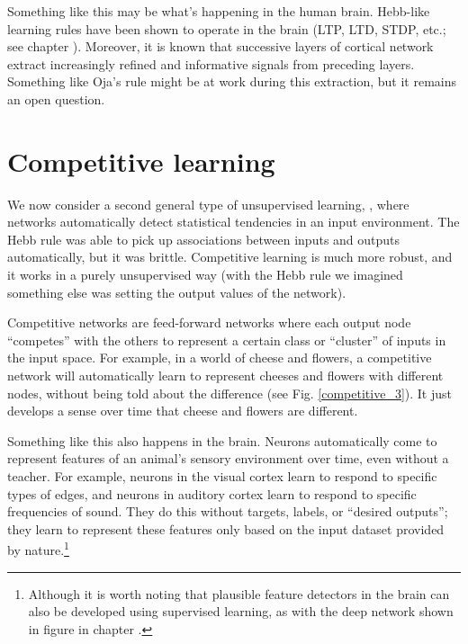 Something like this may be what's happening in the human brain. Hebb-like learning rules  have been shown to operate in the brain (LTP, LTD, STDP, etc.; see chapter ). Moreover, it is known that successive layers of cortical network extract increasingly refined and informative signals from preceding layers. Something like Oja's rule might be at work during this extraction, but it remains an open question.


\section{Competitive learning}


We now consider a second general type of unsupervised learning, , where networks automatically detect statistical tendencies in an input environment. The Hebb rule was able to pick up associations between inputs and outputs automatically, but it was brittle. Competitive learning is much more robust, and it works in a purely unsupervised way (with the Hebb rule we imagined something else was setting the output values of the network).

Competitive networks are feed-forward networks where each output node ``competes'' with the others to represent a certain class or ``cluster'' of inputs in the input space. For example, in a world of cheese and flowers, a competitive network will automatically learn to represent cheeses and flowers with different nodes, without being told about the difference  (see Fig. \ref{competitive_3}). It just develops a sense over time that cheese and flowers are different. 

Something like this also happens in the brain. Neurons automatically come to represent features of an animal's sensory environment over time, even without a teacher. For example, neurons in the visual cortex learn to respond to specific types of edges, and neurons in auditory cortex learn to respond to specific frequencies of sound. They do this without targets, labels, or ``desired outputs''; they learn to represent these features only based on the input dataset provided by nature.\footnote{Although it is worth noting that plausible feature detectors in the brain can also be developed using supervised learning, as with the deep network shown in figure   in chapter .}


